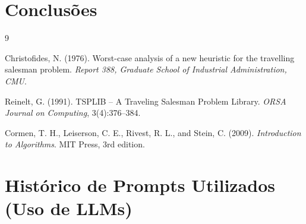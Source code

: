 \documentclass[12pt]{article}
\begin{document}

\section{Conclusões}


\begin{thebibliography}{9}

Christofides, N. (1976).
\newblock Worst-case analysis of a new heuristic for the travelling salesman problem.
\newblock \emph{Report 388, Graduate School of Industrial Administration, CMU}.

Reinelt, G. (1991).
\newblock TSPLIB -- A Traveling Salesman Problem Library.
\newblock \emph{ORSA Journal on Computing}, 3(4):376--384.

Cormen, T. H., Leiserson, C. E., Rivest, R. L., and Stein, C. (2009).
\newblock \emph{Introduction to Algorithms}.
\newblock MIT Press, 3rd edition.

\end{thebibliography}

\appendix
\section{Histórico de Prompts Utilizados (Uso de LLMs)}
\end{document}
